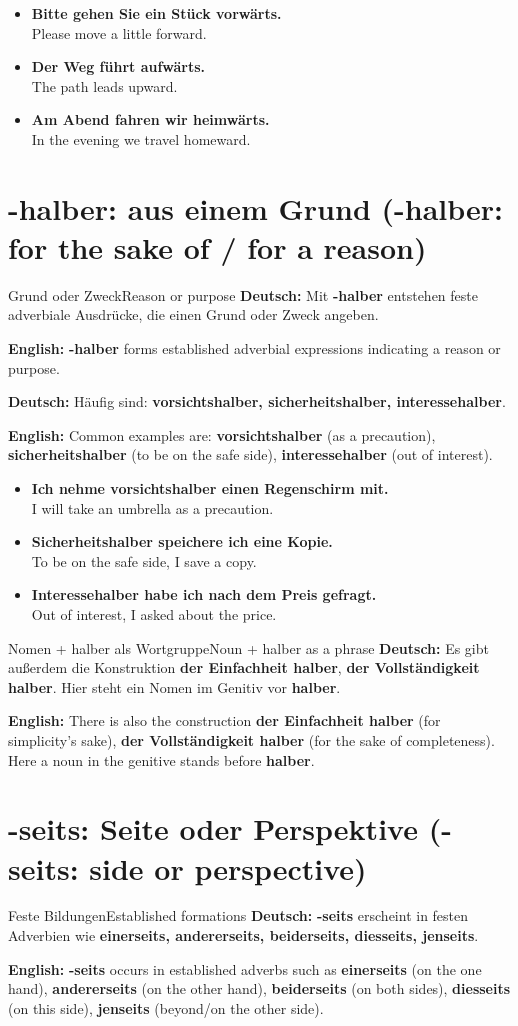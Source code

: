 \documentclass[a4paper,11pt]{article}
\newcommand{\GermanText}[1]{\textbf{Deutsch: }#1\par}
\newcommand{\EnglishText}[1]{{\small\color{SoftGray}\textbf{English: }#1\par}}
\newcommand{\ExampleItem}[2]{\item \textbf{#1}\\{\small\color{SoftGray}#2}}
\newcommand{\BSection}[2]{\section{#1 \textnormal{\small (#2)}}}
\begin{document}
\begin{exbox}
\begin{itemize}
\ExampleItem{Bitte gehen Sie ein Stück vorwärts.}{Please move a little forward.}
\ExampleItem{Der Weg führt aufwärts.}{The path leads upward.}
\ExampleItem{Am Abend fahren wir heimwärts.}{In the evening we travel homeward.}
\end{itemize}
\end{exbox}

\BSection{-halber: aus einem Grund}{-halber: for the sake of / for a reason}

\begin{grammarentry}{Grund oder Zweck}{Reason or purpose}
\GermanText{Mit \textbf{-halber} entstehen feste adverbiale Ausdrücke, die einen Grund oder Zweck angeben.}
\EnglishText{\textbf{-halber} forms established adverbial expressions indicating a reason or purpose.}
\GermanText{Häufig sind: \textbf{vorsichtshalber, sicherheitshalber, interessehalber}.}
\EnglishText{Common examples are: \textbf{vorsichtshalber} (as a precaution), \textbf{sicherheitshalber} (to be on the safe side), \textbf{interessehalber} (out of interest).}
\end{grammarentry}

\begin{exbox}
\begin{itemize}
\ExampleItem{Ich nehme vorsichtshalber einen Regenschirm mit.}{I will take an umbrella as a precaution.}
\ExampleItem{Sicherheitshalber speichere ich eine Kopie.}{To be on the safe side, I save a copy.}
\ExampleItem{Interessehalber habe ich nach dem Preis gefragt.}{Out of interest, I asked about the price.}
\end{itemize}
\end{exbox}

\begin{grammarentry}{Nomen + halber als Wortgruppe}{Noun + halber as a phrase}
\GermanText{Es gibt außerdem die Konstruktion \textbf{der Einfachheit halber}, \textbf{der Vollständigkeit halber}. Hier steht ein Nomen im Genitiv vor \textbf{halber}.}
\EnglishText{There is also the construction \textbf{der Einfachheit halber} (for simplicity's sake), \textbf{der Vollständigkeit halber} (for the sake of completeness). Here a noun in the genitive stands before \textbf{halber}.}
\end{grammarentry}

\BSection{-seits: Seite oder Perspektive}{-seits: side or perspective}

\begin{grammarentry}{Feste Bildungen}{Established formations}
\GermanText{\textbf{-seits} erscheint in festen Adverbien wie \textbf{einerseits, andererseits, beiderseits, diesseits, jenseits}.}
\EnglishText{\textbf{-seits} occurs in established adverbs such as \textbf{einerseits} (on the one hand), \textbf{andererseits} (on the other hand), \textbf{beiderseits} (on both sides), \textbf{diesseits} (on this side), \textbf{jenseits} (beyond/on the other side).}
\end{grammarentry}
\end{document}
